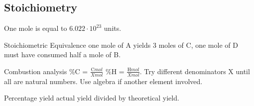 \begin{mdframed}
\begin{multicols}{2}
\subsection{Stoichiometry}
\begin{compactdesc}
\item[One mole] is equal to $6.022 \cdot 10^{23}$ units.
\item[Stoichiometric Equivalence]  one mole of A
    yields 3 moles of C, one mole of D must have consumed half a mole of B.
\item[Combustion analysis] 
    \%C = $\frac{\text{C}mol}{X mol}$
    \%H = $\frac{\text{H}mol}{X mol}$.
    Try different denominators X until all are natural numbers.
    Use algebra if another element involved.
\item[Percentage yield] actual yield divided by theoretical yield.
\end{compactdesc}
\end{multicols}
\end{mdframed}




